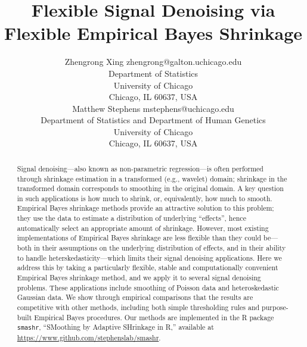 \documentclass[twoside]{article}
\begin{document}
\title{\textbf{Flexible Signal Denoising via Flexible Empirical Bayes
    Shrinkage}}

\author{\name Zhengrong Xing \email zhengrong@galton.uchicago.edu\\ 
\addr Department of Statistics \\
University of Chicago \\
Chicago, IL 60637, USA \\
\AND 
\name Matthew Stephens \email mstephens@uchicago.edu \\ 
\addr Department of Statistics and Department of Human Genetics \\
University of Chicago \\
Chicago, IL 60637, USA}
\date{}
\maketitle


\begin{abstract}
Signal denoising---also known as non-parametric regression---is often
performed through shrinkage estimation in a transformed (e.g.,
wavelet) domain; shrinkage in the transformed domain corresponds to
smoothing in the original domain. A key question in such applications
is how much to shrink, or, equivalently, how much to smooth. Empirical
Bayes shrinkage methods provide an attractive solution to this
problem; they use the data to estimate a distribution of underlying
``effects'', hence automatically select an appropriate amount of
shrinkage. However, most existing implementations of Empirical Bayes
shrinkage are less flexible than they could be---both in their
assumptions on the underlying distribution of effects, and in their
ability to handle heterskedasticity---which limits their signal
denoising applications. Here we address this by taking a particularly
flexible, stable and computationally convenient Empirical Bayes
shrinkage method, and we apply it to several signal denoising
problems. These applications include smoothing of Poisson data and
heteroskedastic Gaussian data. We show through empirical comparisons
that the results are competitive with other methods, including both
simple thresholding rules and purpose-built Empirical Bayes
procedures. Our methods are implemented in the R package {\tt smashr},
``SMoothing by Adaptive SHrinkage in R,'' available at
\url{https://www.github.com/stephenslab/smashr}.
\end{abstract}
\end{document}
